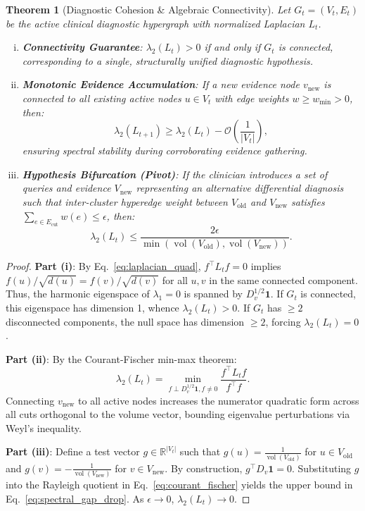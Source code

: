 \documentclass[10pt, onecolumn]{article}
\newtheorem{theorem}{Theorem}[section]
\DeclareMathOperator{\vol}{vol}
\newcommand{\R}{\mathbb{R}}
\begin{document}
\begin{theorem}[Diagnostic Cohesion \& Algebraic Connectivity]
\label{thm:fiedler_cohesion}
Let $G_t = (V_t, E_t)$ be the active clinical diagnostic hypergraph with normalized Laplacian $L_t$.
\begin{enumerate}[(i)]
  \item \textbf{Connectivity Guarantee}: $\lambda_2(L_t) > 0$ if and only if $G_t$ is connected, corresponding to a single, structurally unified diagnostic hypothesis.
  \item \textbf{Monotonic Evidence Accumulation}: If a new evidence node $v_{\text{new}}$ is connected to all existing active nodes $u \in V_t$ with edge weights $w \ge w_{\min} > 0$, then:
  \begin{equation}
    \lambda_2(L_{t+1}) \ge \lambda_2(L_t) - \mathcal{O}\!\left(\frac{1}{|V_t|}\right),
  \end{equation}
  ensuring spectral stability during corroborating evidence gathering.
  \item \textbf{Hypothesis Bifurcation (Pivot)}: If the clinician introduces a set of queries and evidence $V_{\text{new}}$ representing an alternative differential diagnosis such that inter-cluster hyperedge weight between $V_{\text{old}}$ and $V_{\text{new}}$ satisfies $\sum_{e \in E_{\text{cut}}} w(e) \le \epsilon$, then:
  \begin{equation}
    \lambda_2(L_t) \le \frac{2 \epsilon}{\min(\vol(V_{\text{old}}), \vol(V_{\text{new}}))}.
    \label{eq:spectral_gap_drop}
  \end{equation}
\end{enumerate}
\end{theorem}

\begin{proof}
\textbf{Part (i)}: By Eq.~\eqref{eq:laplacian_quad}, $f^\top L_t f = 0$ implies $f(u)/\sqrt{d(u)} = f(v)/\sqrt{d(v)}$ for all $u, v$ in the same connected component. Thus, the harmonic eigenspace of $\lambda_1 = 0$ is spanned by $D_v^{1/2} \mathbf{1}$. If $G_t$ is connected, this eigenspace has dimension 1, whence $\lambda_2(L_t) > 0$. If $G_t$ has $\ge 2$ disconnected components, the null space has dimension $\ge 2$, forcing $\lambda_2(L_t) = 0$.

\textbf{Part (ii)}: By the Courant-Fischer min-max theorem:
\begin{equation}
  \lambda_2(L_t) = \min_{f \perp D_v^{1/2}\mathbf{1}, f \ne 0} \frac{f^\top L_t f}{f^\top f}.
  \label{eq:courant_fischer}
\end{equation}
Connecting $v_{\text{new}}$ to all active nodes increases the numerator quadratic form across all cuts orthogonal to the volume vector, bounding eigenvalue perturbations via Weyl's inequality.

\textbf{Part (iii)}: Define a test vector $g \in \R^{|V_t|}$ such that $g(u) = \frac{1}{\vol(V_{\text{old}})}$ for $u \in V_{\text{old}}$ and $g(v) = -\frac{1}{\vol(V_{\text{new}})}$ for $v \in V_{\text{new}}$. By construction, $g^\top D_v \mathbf{1} = 0$. Substituting $g$ into the Rayleigh quotient in Eq.~\eqref{eq:courant_fischer} yields the upper bound in Eq.~\eqref{eq:spectral_gap_drop}. As $\epsilon \to 0$, $\lambda_2(L_t) \to 0$.
\end{proof}
\end{document}
